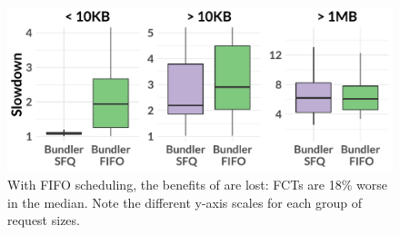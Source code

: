 \begin{figure}
    \centering
\begin{knitrout}
\color{fgcolor}
\includegraphics[width=\maxwidth]{figure/eval:fifo-1} 

\end{knitrout}
    \caption{With FIFO scheduling, the benefits of \name are lost: FCTs are 18\% worse in the median. Note the different y-axis scales for each group of request sizes.}
    \label{fig:eval:fifo}
\end{figure}
\newcommand{\overviewBenefitsFifoMedian}{1.96\xspace}
\newcommand{\overviewBenefitsFifoWorse}{18\%\xspace}
